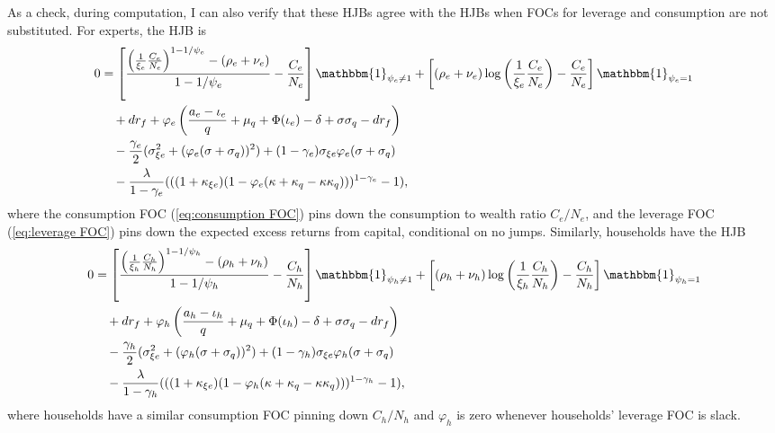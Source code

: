 \documentclass[12 pt, oneside]{article}
\theoremstyle{definition}
\theoremstyle{definition}
\theoremstyle{definition}
\begin{document}
As a check, during computation, I can also verify that these HJBs agree with the HJBs when FOCs for leverage and consumption are not substituted. For experts, the HJB is
\begin{align}
\label{eq:expert HJB no sub lvg FOC}
  \begin{split}
0      & =\left[ \frac{\left(\frac{1}{\xi_e}\frac{C_e}{N_e}\right)^{1 - 1/\psi_e} - (\rho_e + \nu_e) }{1 - 1/\psi_e} - \frac{C_e}{N_e}\right]\mathbbm{1}_{\psi_e\neq 1} + \left[(\rho_e + \nu_e)\log\left(\frac{1}{\xi_e}\frac{C_e}{N_e} \right) - \frac{C_e}{N_e}\right]\mathbbm{1}_{\psi_e = 1}\\
    &\quad + dr_f + \varphi_e\left(\frac{a_e - \iota_e}{q} + \mu_q + \Phi(\iota_e) - \delta + \sigma\sigma_q - dr_f\right)\\
    & \quad - \frac{\gamma_e}{2}(\sigma_{\xi e}^2 + (\varphi_e(\sigma + \sigma_q))^2) + (1 - \gamma_e)\sigma_{\xi e}\varphi_e(\sigma + \sigma_q)\\
    & \quad - \frac{\lambda}{1 - \gamma_e}((( 1 + \kappa_{\xi e})(1 - \varphi_e(\kappa + \kappa_q - \kappa\kappa_q)))^{1 - \gamma_e} - 1),
\end{split}
\end{align}
where the consumption FOC  (\ref{eq:consumption FOC})  pins down the consumption to wealth ratio $C_e / N_e$, and the leverage FOC (\ref{eq:leverage FOC}) pins down the expected excess returns from capital, conditional on no jumps. Similarly, households have the HJB
\begin{align}
\label{eq:hh HJB no sub lvg FOC}
  \begin{split}
0      & =\left[ \frac{\left(\frac{1}{\xi_h}\frac{C_h}{N_h}\right)^{1 - 1/\psi_h} - (\rho_h + \nu_h) }{1 - 1/\psi_h} - \frac{C_h}{N_h}\right]\mathbbm{1}_{\psi_h\neq 1} + \left[(\rho_h + \nu_h)\log\left(\frac{1}{\xi_h}\frac{C_h}{N_h} \right) - \frac{C_h}{N_h}\right]\mathbbm{1}_{\psi_h = 1}\\
    &\quad + dr_f + \varphi_h\left(\frac{a_h - \iota_h}{q} + \mu_q + \Phi(\iota_h) - \delta + \sigma\sigma_q - dr_f\right)\\
    & \quad - \frac{\gamma_h}{2}(\sigma_{\xi e}^2 + (\varphi_h(\sigma + \sigma_q))^2) + (1 - \gamma_h)\sigma_{\xi e}\varphi_h(\sigma + \sigma_q)\\
    & \quad - \frac{\lambda}{1 - \gamma_h}((( 1 + \kappa_{\xi e})(1 - \varphi_h(\kappa + \kappa_q - \kappa\kappa_q)))^{1 - \gamma_h} - 1),
\end{split}
\end{align}
where households have a similar consumption FOC pinning down $C_h / N_h$ and $\varphi_h$ is zero whenever households' leverage FOC is slack.
\end{document}
